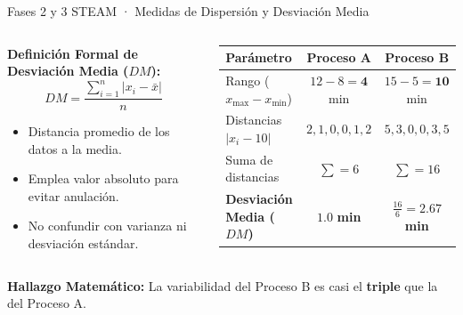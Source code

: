 \documentclass[
	spanish,
	aspectratio=169,
	xcolor={dvipsnames,table}
]{beamer}
\begin{document}
\begin{frame}{Fases 2 y 3 STEAM · Medidas de Dispersión y Desviación Media}
\small
\begin{columns}[T]
	\begin{column}{0.46\textwidth}
		\textbf{Definición Formal de Desviación Media ($DM$):}
		\begin{equation*}
			DM = \frac{\sum_{i=1}^{n} |x_i - \bar{x}|}{n}
		\end{equation*}
		\vspace{-0.2cm}
		\begin{itemize}\setlength{\itemsep}{0.1cm}
			\item Distancia promedio de los datos a la media.
			\item Emplea valor absoluto para evitar anulación.
			\item No confundir con varianza ni desviación estándar.
		\end{itemize}
	\end{column}
	\begin{column}{0.52\textwidth}
		\renewcommand{\arraystretch}{1.15}
		\begin{tabularx}{\linewidth}{l|c|c}
			\toprule
			\rowcolor{iiiepePale} \textbf{Parámetro} & \textbf{Proceso A} & \textbf{Proceso B} \\
			\midrule
			Rango ($x_{\max}-x_{\min}$) & $12 - 8 = \mathbf{4}$ min & $15 - 5 = \mathbf{10}$ min \\
			Distancias $|x_i - 10|$ & $2, 1, 0, 0, 1, 2$ & $5, 3, 0, 0, 3, 5$ \\
			Suma de distancias & $\sum = 6$ & $\sum = 16$ \\
			\textbf{Desviación Media ($DM$)} & $\mathbf{1.0}$ \textbf{min} & $\frac{16}{6} = \mathbf{2.67}$ \textbf{min} \\
			\bottomrule
		\end{tabularx}
	\end{column}
\end{columns}
\vspace{0.3cm}
\centering
\colorbox{iiiepePale}{\textbf{Hallazgo Matemático:} La variabilidad del Proceso B es casi el \textbf{triple} que la del Proceso A.}
\end{frame}
\end{document}
